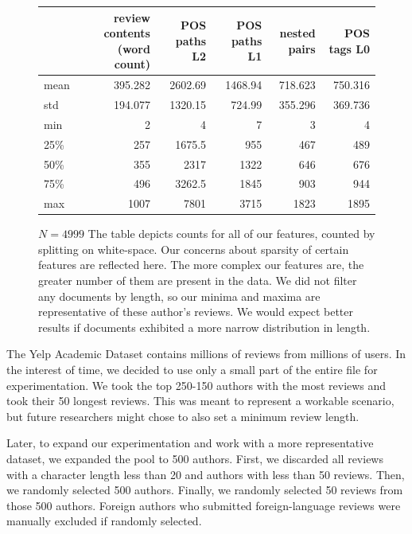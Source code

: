 \documentclass[11pt,a4paper]{article}
\begin{document}
\begin{figure}[h]
    \centering
\begin{tabular}{lrrrrr}
\toprule
{} & review contents (word count) & POS paths L2 & POS paths L1 & nested pairs & POS tags L0 \\
\midrule
mean  &         395.282 &           2602.69 &          1468.94 &            718.623 &  750.316 \\
std   &         194.077 &           1320.15 &           724.99 &            355.296 &  369.736 \\
min   &               2 &                 4 &                7 &                  3 &        4 \\
25\%   &             257 &            1675.5 &              955 &                467 &      489 \\
50\%   &             355 &              2317 &             1322 &                646 &      676 \\
75\%   &             496 &            3262.5 &             1845 &                903 &      944 \\
max   &            1007 &              7801 &             3715 &               1823 &     1895 \\
\bottomrule
\end{tabular}
    \caption{$N=4999$ The table depicts counts for all of our features, counted by splitting on white-space. Our concerns about sparsity of certain features are reflected here. The more complex our features are, the greater number of them are present in the data. We did not filter any documents by length, so our minima and maxima are representative of these author's reviews. We would expect better results if documents exhibited a more narrow distribution in length. }
    \label{fig:data_summary}
\end{figure}

The Yelp Academic Dataset contains millions of reviews from millions of users. In the interest of time, we decided to use only a small part of the entire file for experimentation. We took the top 250-150 authors with the most reviews and took their 50 longest reviews. This was meant to represent a workable scenario, but future researchers might chose to also set a minimum review length.

Later, to expand our experimentation and work with a more representative dataset, we expanded the pool to 500 authors. First, we discarded all reviews with a character length less than 20 and authors with less than 50 reviews. Then, we randomly selected 500 authors. Finally, we randomly selected 50 reviews from those 500 authors. Foreign authors who submitted foreign-language reviews were manually excluded if randomly selected.
\end{document}
